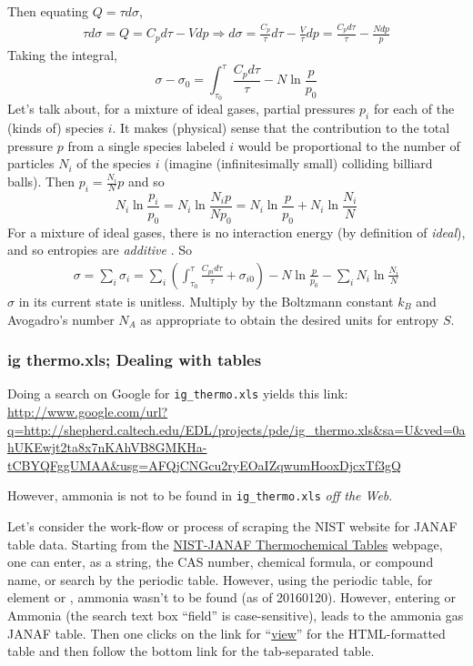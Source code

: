 \documentclass[10pt]{amsart}
\begin{document}
\begin{multicols*}{2}
Then equating $Q = \tau d\sigma$, 
\[
\begin{gathered}
\tau d\sigma = Q = C_p d\tau - V dp \Longrightarrow d\sigma = \frac{C_p}{\tau}{d\tau}  - \frac{V}{\tau} dp = \frac{C_p d\tau}{\tau} - \frac{N dp}{p}
\end{gathered}
\]
Taking the integral,
\[
\sigma -\sigma_0 = \int_{\tau_0}^{\tau} \frac{C_p d\tau}{\tau} - N\ln{ \frac{p}{p_0} }
\]
Let's talk about, for a mixture of ideal gases,  partial pressures $p_i$ for each of the (kinds of) species $i$.  It makes (physical) sense that the contribution to the total pressure $p$ from a single species labeled $i$ would be proportional to the number of particles $N_i$ of the species $i$ (imagine (infinitesimally small) colliding billiard balls).  Then $p_i = \frac{N_i}{N} p$ and so 
\[
N_i \ln{ \frac{p_i}{p_0} } = N_i \ln{ \frac{N_i p}{Np_0} } = N_i \ln{ \frac{p}{p_0}} + N_i \ln{ \frac{N_i}{N} }
\]
For a mixture of ideal gases, there is no interaction energy (by definition of \emph{ideal}), and so entropies are \emph{additive} \cite{LLandauELifshitz1980}.  So 
\[
\begin{gathered}
  \sigma = \sum_i \sigma_i = \sum_i \left( \int_{\tau_0}^{\tau} \frac{C_{pi} d\tau }{\tau} + \sigma_{i0} \right) - N \ln{ \frac{p}{p_0} } - \sum_i N_i \ln{ \frac{N_i}{N} }
\end{gathered}
\]
$\sigma$ in its current state is unitless.  Multiply by the Boltzmann constant $k_B$ and Avogadro's number $N_A$ as appropriate to obtain the desired units for entropy $S$.  

\subsubsection{ig thermo.xls; Dealing with tables}

Doing a search on Google for \verb|ig_thermo.xls| yields this link: \\
\url{http://www.google.com/url?q=http://shepherd.caltech.edu/EDL/projects/pde/ig_thermo.xls&sa=U&ved=0ahUKEwjt2ta8x7nKAhVB8GMKHa-tCBYQFggUMAA&usg=AFQjCNGcu2ryEOaIZqwumHooxDjcxTf3gQ}

However, ammonia is not to be found in \verb|ig_thermo.xls| \emph{off the Web}.  

Let's consider the work-flow or process of scraping the NIST website for JANAF table data.  Starting from the \href{http://kinetics.nist.gov/janaf/}{NIST-JANAF Thermochemical Tables} webpage, one can enter, as a string, the CAS number, chemical formula, or compound name, or search by the periodic table.  However, using the periodic table, for element  or , ammonia wasn't to be found (as of 20160120).  However, entering  or Ammonia (the search text box ``field'' is case-sensitive), leads to the ammonia gas JANAF table.  Then one clicks on the link for ``\href{http://kinetics.nist.gov/janaf/html/H-083.html}{view}'' for the HTML-formatted table and then follow the bottom link for the tab-separated table.  


\end{multicols*}
\end{document}

